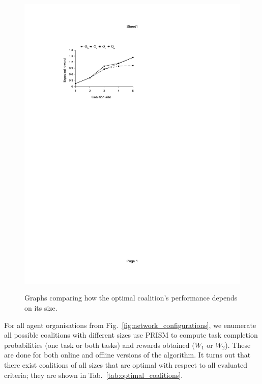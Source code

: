 \documentclass{llncs}
\begin{document}
\begin{figure}[t]
{\includegraphics[clip=true, trim=101 520 280 115, scale=0.65]{images/w2_stpg_online}
}
\caption{Graphs comparing how the optimal coalition's performance depends on its size.
}
\label{fig:coalition_performance}
\end{figure}
%
For all agent organisations from Fig.~\ref{fig:network_configurations}, we enumerate all possible coalitions with different sizes use PRISM to compute task completion probabilities (one task or both tasks) and rewards obtained ($W_1$ or $W_2$). These are done for both online and offline versions of the algorithm. It turns out that there exist coalitions of all sizes that are optimal with respect to all evaluated criteria; they are shown in Tab.~\ref{tab:optimal_coalitions}.
\end{document}
